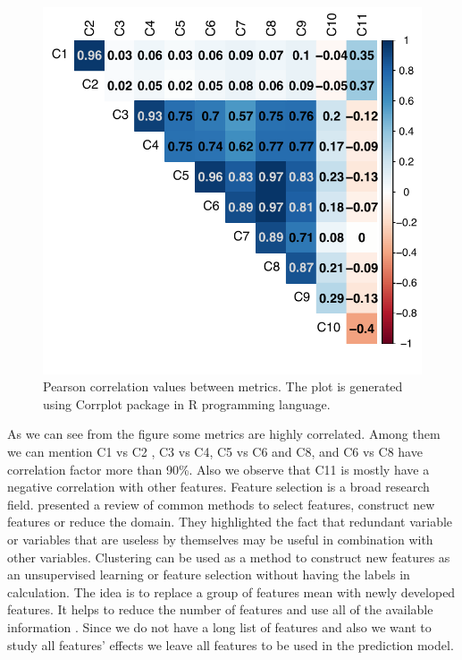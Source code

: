 \begin{figure}
    \centering
    \includegraphics[width=\columnwidth]{figures/pdf/Figure_10.pdf}
    \caption{Pearson correlation values between metrics. The plot is generated using Corrplot package  \citep{Corrplot_2016}  in R programming language.}
    \label{fig:Corplot}
\end{figure}

As we can see from the figure some metrics are highly correlated. Among them we can mention C1 vs C2 , C3 vs C4, C5 vs C6 and C8, and C6 vs C8 have correlation factor more than 90\%. Also we observe that C11 is mostly have a negative correlation with other features. Feature selection is a broad research field. \citet{Guyon_2003} presented a review of common methods to select features, construct new features or reduce the domain. They highlighted the fact that redundant variable or variables that are useless by themselves may be useful in combination with other variables. Clustering can be used as a method to construct new features as an unsupervised learning or feature selection without having the labels in calculation. The idea is to replace a group of features mean with newly developed features. It helps to reduce the number of features and use all of the available information \citep{Duda_1973,Guyon_2003}. Since we do not have a long list of features and also we want to study all features' effects we leave all features to be used in the prediction model. 


